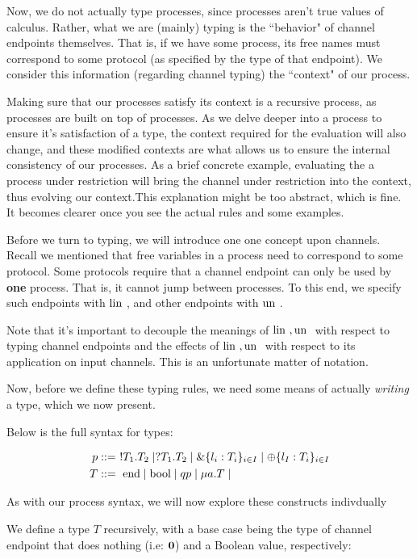 Now, we do not actually type processes, since processes aren't true values of calculus. Rather, what we are (mainly) typing is the ``behavior" of channel endpoints themselves. That is, if we have some process, its free names must correspond to some protocol (as specified by the type of that endpoint). We consider this information (regarding channel typing) the ``context" of our process.

Making sure that our processes satisfy its context is a recursive process, as processes are built on top of processes. As we delve deeper into a process to ensure it's satisfaction of a type, the context required for the evaluation will also change, and these modified contexts are what allows us to ensure the internal consistency of our processes. As a brief concrete example, evaluating the a process under restriction will bring the channel under restriction into the context, thus evolving our context.This explanation might be too abstract, which is fine. It becomes clearer once you see the actual rules and some examples.

Before we turn to typing, we will introduce one one concept upon channels. Recall we mentioned that free variables in a process need to correspond to some protocol. Some protocols require that a channel endpoint can only be used by \textbf{one} process. That is, it cannot jump between processes. To this end, we specify such endpoints with $\text{lin }$, and other endpoints with $\text{un }$.

Note that it's important to decouple the meanings of $\text{lin }, \text{un }$ with respect to typing channel endpoints and the effects of $\text{lin }, \text{un }$ with respect to its application on input channels. This is an unfortunate  matter of notation.

Now, before we define these typing rules, we need some means of actually \textit{writing} a type, which we now present.

Below is the full syntax for types:

\begin{align*}
p &::=\ !T_1.T_2 \mid ?T_1.T_2 \mid \&\{l_i : T_i\}_{i \in I} \mid \oplus \{l_I : T_i\}_{i \in I} \\
T &::=\ \text{end} \mid \text{bool} \mid q p \mid \mu a . T \mid
\end{align*}

As with our process syntax, we will now explore these constructs indivdually

We define a type $T$ recursively, with a base case being the type of channel endpoint that does nothing (i.e: $\textbf{0}$) and a Boolean value, respectively:

